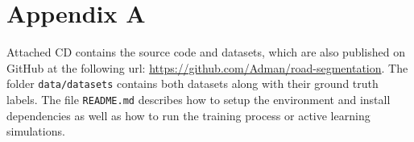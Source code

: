 \chapter*{Appendix A}

Attached CD contains the source code and datasets, which are also published on GitHub
at the following url: \url{https://github.com/Adman/road-segmentation}.
The folder \verb'data/datasets' contains both datasets along with their ground truth labels.
The file \verb'README.md' describes how to setup the environment and install dependencies as well
as how to run the training process or active learning simulations.